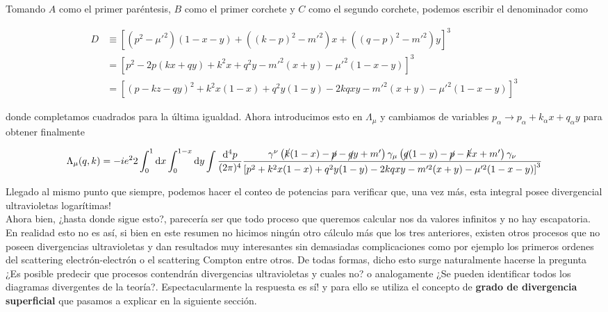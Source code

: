 \documentclass{article}
\numberwithin{equation}{section}
\begin{document}
Tomando $ A $ como el primer paréntesis, $ B $ como el primer corchete y $ C $ como el segundo corchete, podemos escribir el denominador como

\begin{equation}\label{key}
\begin{aligned}
D &\equiv \left[(p^2-\mu'^2)(1-x-y) + ((k-p)^2-m'^2)x + ((q-p)^2-m'^2)y\right]^3\\
&= \left[p^2 -2p(kx+qy) + k^2x +q^2y -m'^2(x+y) -\mu'^2(1-x-y)\right]^3\\
&=\left[(p-kz-qy)^2 + k^2x(1-x) +q^2y(1-y) -2kqxy -m'^2(x+y) -\mu'^2(1-x-y)\right]^3
\end{aligned}
\end{equation}

donde completamos cuadrados para la última igualdad. Ahora introducimos esto en $ \Lambda_{\mu} $ y cambiamos de variables $ p_{\alpha} \longrightarrow p_{\alpha} + k_{\alpha}x + q_{\alpha}y $ para obtener finalmente

\begin{equation}
\Lambda_{\mu}(q,k)=-ie^22\int_0^1\mathrm{d}x\int_0^{1-x}\mathrm{d}y \int \frac{\mathrm{d^4}p}{(2\pi)^4} \frac{  \gamma^{\nu}\left(\cancel{k}(1-x)-\cancel{p} -\cancel{q}y+m'\right)\gamma_{\mu}\left( \cancel{q}(1-y)-\cancel{p} -\cancel{k}x +m'\right)\gamma_{\nu}}{\left[p^2 + k^2x(1-x) +q^2y(1-y) -2kqxy -m'^2(x+y) -\mu'^2(1-x-y)\right]^3}
\end{equation}

Llegado al mismo punto que siempre, podemos hacer el conteo de potencias para verificar que, una vez más, esta integral posee divergencial ultravioletas logarítimas!\\

 
Ahora bien, ¿hasta donde sigue esto?, parecería ser que todo proceso que queremos calcular nos da valores infinitos y no hay escapatoria. En realidad esto no es así, si bien en este resumen no hicimos ningún otro cálculo más que los tres anteriores, existen otros procesos que no poseen divergencias ultravioletas y dan resultados muy interesantes sin demasiadas complicaciones como por ejemplo los primeros ordenes del scattering electrón-electrón o el scattering Compton entre otros. De todas formas, dicho esto surge naturalmente hacerse la pregunta ¿Es posible predecir que procesos contendrán divergencias ultravioletas y cuales no? o analogamente ¿Se pueden identificar todos los diagramas divergentes de la teoría?. Espectacularmente la respuesta es sí! y para ello se utiliza el concepto de \textbf{grado de divergencia superficial} que pasamos a explicar en la siguiente sección.
\end{document}
